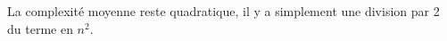 La complexité moyenne reste quadratique, il y a simplement une division par 2 du terme en $n^2$.








